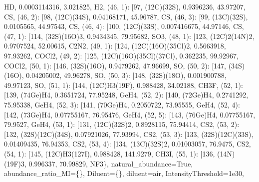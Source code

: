 \documentclass[letterpaper,10pt,english]{sphinxmanual}
\begin{document}
\begin{fulllineitems}
\textquotesingle{}HD\textquotesingle{}, 0.0003114316, 3.021825, \textquotesingle{}H2\textquotesingle{}{]}, (46, 1): {[}97, \textquotesingle{}(12C)(32S)\textquotesingle{}, 0.9396236, 43.97207, \textquotesingle{}CS\textquotesingle{}{]}, (46, 2): {[}98, \textquotesingle{}(12C)(34S)\textquotesingle{}, 0.04168171, 45.96787, \textquotesingle{}CS\textquotesingle{}{]}, (46, 3): {[}99, \textquotesingle{}(13C)(32S)\textquotesingle{}, 0.0105565, 44.97543, \textquotesingle{}CS\textquotesingle{}{]}, (46, 4): {[}100, \textquotesingle{}(12C)(33S)\textquotesingle{}, 0.007416675, 44.97146, \textquotesingle{}CS\textquotesingle{}{]}, (47, 1): {[}114, \textquotesingle{}(32S)(16O)3\textquotesingle{}, 0.9434345, 79.95682, \textquotesingle{}SO3\textquotesingle{}{]}, (48, 1): {[}123, \textquotesingle{}(12C)2(14N)2\textquotesingle{}, 0.9707524, 52.00615, \textquotesingle{}C2N2\textquotesingle{}{]}, (49, 1): {[}124, \textquotesingle{}(12C)(16O)(35Cl)2\textquotesingle{}, 0.5663918, 97.93262, \textquotesingle{}COCl2\textquotesingle{}{]}, (49, 2): {[}125, \textquotesingle{}(12C)(16O)(35Cl)(37Cl)\textquotesingle{}, 0.362235, 99.92967, \textquotesingle{}COCl2\textquotesingle{}{]}, (50, 1): {[}146, \textquotesingle{}(32S)(16O)\textquotesingle{}, 0.9479262, 47.96699, \textquotesingle{}SO\textquotesingle{}{]}, (50, 2): {[}147, \textquotesingle{}(34S)(16O)\textquotesingle{}, 0.04205002, 49.96278, \textquotesingle{}SO\textquotesingle{}{]}, (50, 3): {[}148, \textquotesingle{}(32S)(18O)\textquotesingle{}, 0.001900788, 49.97123, \textquotesingle{}SO\textquotesingle{}{]}, (51, 1): {[}144, \textquotesingle{}(12C)H3(19F)\textquotesingle{}, 0.988428, 34.02188, \textquotesingle{}CH3F\textquotesingle{}{]}, (52, 1): {[}139, \textquotesingle{}(74Ge)H4\textquotesingle{}, 0.3651724, 77.95248, \textquotesingle{}GeH4\textquotesingle{}{]}, (52, 2): {[}140, \textquotesingle{}(72Ge)H4\textquotesingle{}, 0.2741292, 75.95338, \textquotesingle{}GeH4\textquotesingle{}{]}, (52, 3): {[}141, \textquotesingle{}(70Ge)H4\textquotesingle{}, 0.2050722, 73.95555, \textquotesingle{}GeH4\textquotesingle{}{]}, (52, 4): {[}142, \textquotesingle{}(73Ge)H4\textquotesingle{}, 0.07755167, 76.95476, \textquotesingle{}GeH4\textquotesingle{}{]}, (52, 5): {[}143, \textquotesingle{}(76Ge)H4\textquotesingle{}, 0.07755167, 79.9527, \textquotesingle{}GeH4\textquotesingle{}{]}, (53, 1): {[}131, \textquotesingle{}(12C)(32S)2\textquotesingle{}, 0.8928115, 75.94414, \textquotesingle{}CS2\textquotesingle{}{]}, (53, 2): {[}132, \textquotesingle{}(32S)(12C)(34S)\textquotesingle{}, 0.07921026, 77.93994, \textquotesingle{}CS2\textquotesingle{}{]}, (53, 3): {[}133, \textquotesingle{}(32S)(12C)(33S)\textquotesingle{}, 0.01409435, 76.94353, \textquotesingle{}CS2\textquotesingle{}{]}, (53, 4): {[}134, \textquotesingle{}(13C)(32S)2\textquotesingle{}, 0.01003057, 76.9475, \textquotesingle{}CS2\textquotesingle{}{]}, (54, 1): {[}145, \textquotesingle{}(12C)H3(127I)\textquotesingle{}, 0.988428, 141.9279, \textquotesingle{}CH3I\textquotesingle{}{]}, (55, 1): {[}136, \textquotesingle{}(14N)(19F)3\textquotesingle{}, 0.996337, 70.99829, \textquotesingle{}NF3\textquotesingle{}{]}\}, natural\_abundance=True, abundance\_ratio\_MI=\{\}, Diluent=\{\}, diluent=\textquotesingle{}air\textquotesingle{}, IntensityThreshold=1e\sphinxhyphen{}30, 
\end{fulllineitems}
\end{document}
